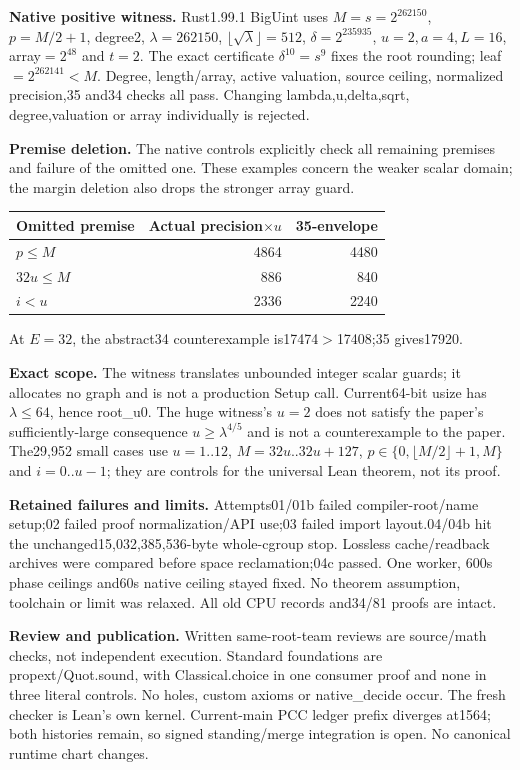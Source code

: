 \documentclass[10pt]{article}
\begin{document}
\textbf{Native positive witness.} Rust1.99.1 BigUint uses
$M=s=2^{262150}$, $p=M/2+1$, degree2, $\lambda=262150$,
$\lfloor\sqrt\lambda\rfloor=512$, $\delta=2^{235935}$,
$u=2,a=4,L=16$, array$=2^{48}$ and $t=2$.
The exact certificate $\delta^{10}=s^9$ fixes the root rounding;
leaf$=2^{262141}<M$. Degree, length/array, active valuation, source ceiling,
normalized precision,35 and34 checks all pass. Changing lambda,u,delta,sqrt,
degree,valuation or array individually is rejected.

\textbf{Premise deletion.} The native controls explicitly check all remaining
premises and failure of the omitted one. These examples concern the weaker
scalar domain; the margin deletion also drops the stronger array guard.

\begin{center}\begin{tabular}{lrr}
\toprule
Omitted premise & Actual precision$\times u$ &35-envelope\\\midrule
$p\le M$ &4864&4480\\
$32u\le M$ &886&840\\
$i<u$ &2336&2240\\\bottomrule
\end{tabular}\end{center}
At $E=32$, the abstract34 counterexample is17474$>$17408;35 gives17920.

\textbf{Exact scope.} The witness translates unbounded integer scalar guards;
it allocates no graph and is not a production Setup call. Current64-bit usize
has $\lambda\le64$, hence root\_u0. The huge witness's $u=2$ does not satisfy
the paper's sufficiently-large consequence $u\ge\lambda^{4/5}$ and is not a
counterexample to the paper. The29,952 small cases use $u=1..12$,
$M=32u..32u+127$, $p\in\{0,\lfloor M/2\rfloor+1,M\}$ and $i=0..u-1$;
they are controls for the universal Lean theorem, not its proof.

\textbf{Retained failures and limits.} Attempts01/01b failed compiler-root/name
setup;02 failed proof normalization/API use;03 failed import layout.04/04b hit
the unchanged15,032,385,536-byte whole-cgroup stop. Lossless cache/readback
archives were compared before space reclamation;04c passed. One worker,
600s phase ceilings and60s native ceiling stayed fixed. No theorem assumption,
toolchain or limit was relaxed. All old CPU records and34/81 proofs are intact.

\textbf{Review and publication.} Written same-root-team reviews are source/math
checks, not independent execution. Standard foundations are propext/Quot.sound,
with Classical.choice in one consumer proof and none in three literal controls.
No holes, custom axioms or native\_decide occur. The fresh checker is Lean's own
kernel. Current-main PCC ledger prefix diverges at1564; both histories remain,
so signed standing/merge integration is open. No canonical runtime chart changes.
\end{document}
